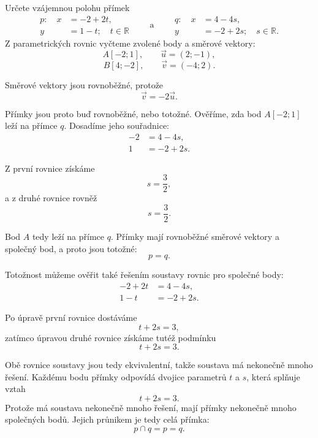 \begin{example}\label{exa:Coincident_parametric_lines}
    Určete vzájemnou polohu přímek
    \[
        \begin{aligned}
            p:\quad x &= -2 + 2t,\\
                    y &= 1 - t;
                    \quad t\in\mathbb{R}
        \end{aligned}
        \qquad\text{a}\qquad
        \begin{aligned}
            q:\quad x &= 4 - 4s,\\
                    y &= -2 + 2s;
                    \quad s\in\mathbb{R}.
        \end{aligned}
    \]
    Z parametrických rovnic vyčteme zvolené body a směrové vektory:
    \[
        A[-2;1],
        \qquad
        \vec{u}=(2;-1),
    \]
    \[
        B[4;-2],
        \qquad
        \vec{v}=(-4;2).
    \]

    Směrové vektory jsou rovnoběžné, protože
    \[
        \vec{v}=-2\vec{u}.
    \]

    Přímky jsou proto buď rovnoběžné, nebo totožné. 
    Ověříme, zda bod $A[-2;1]$ leží na přímce $q$. Dosadíme jeho souřadnice:
    \begin{align*}
        -2 &= 4-4s,\\
        1 &= -2+2s.
    \end{align*}

    Z první rovnice získáme
    \[
        s=\frac32,
    \]
    a z druhé rovnice rovněž
    \[
        s=\frac32.
    \]

    Bod $A$ tedy leží na přímce $q$. Přímky mají rovnoběžné směrové
    vektory a společný bod, a proto jsou totožné:
    \[
        p=q.
    \]

    Totožnost můžeme ověřit také řešením soustavy rovnic pro společné
    body:
    \begin{align*}
        -2+2t &= 4-4s,\\
        1-t &= -2+2s.
    \end{align*}

    Po úpravě první rovnice dostáváme
    \[
        t+2s=3,
    \]
    zatímco úpravou druhé rovnice získáme tutéž podmínku
    \[
        t+2s=3.
    \]

    Obě rovnice soustavy jsou tedy ekvivalentní, takže soustava má nekonečně mnoho řešení. 
    Každému bodu přímky odpovídá dvojice parametrů $t$ a $s$, která splňuje vztah
    \[
        t+2s=3.
    \]
    Protože má soustava nekonečně mnoho řešení, 
    mají přímky nekonečně mnoho společných bodů. Jejich průnikem je tedy celá přímka:
    \[
        p\cap q=p=q.
    \]
\end{example}


